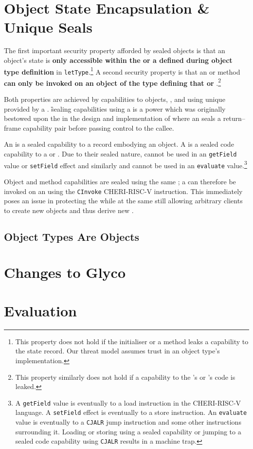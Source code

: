 \documentclass[main.tex]{subfiles}
\begin{document}
\section{Object State Encapsulation \& Unique Seals} \label{sct:obj-sec}
The first important security property afforded by sealed objects is that an object's state is \textbf{only accessible within the  or a  defined during object type definition} in \texttt{letType}.\footnote{This property does not hold if the initialiser or a method leaks a capability to the state record. Our threat model assumes trust in an object type's implementation.} A second security property is that an  or method \textbf{can only be invoked on an object of the type defining that  or }.\footnote{This property similarly does not hold if a capability to the 's or 's code is leaked.}

Both properties are achieved by  capabilities to objects, , and  using unique  provided by a . \G{sealing} capabilities using a  is a power which was originally bestowed upon the  in the design and implementation of  where an  seals a return–frame capability pair before passing control to the callee.

An \textbf{} is a sealed capability to a record embodying an object. A \textbf{} is a sealed code capability to a  or . Due to their sealed nature,  cannot be used in an \texttt{getField} value or \texttt{setField} effect and similarly  and  cannot be used in an \texttt{evaluate} value.\footnote{A \texttt{getField} value is eventually \lowered{} to a load instruction in the CHERI-RISC-V language. A \texttt{setField} effect is eventually \lowered{} to a store instruction. An \texttt{evaluate} value is eventually \lowered{} to a \texttt{CJALR} jump instruction and some other instructions surrounding it. Loading or storing using a sealed capability or jumping to a sealed code capability using \texttt{CJALR} results in a machine trap.}

Object and method capabilities are sealed using the same ; a  can therefore be invoked on an  using the \texttt{CInvoke} CHERI-RISC-V instruction. This immediately poses an issue in protecting the  while at the same still allowing arbitrary clients to create new objects and thus derive new .

\subsection{Object Types Are Objects}

\section{Changes to Glyco} \label{sct:obj-changes}

\section{Evaluation} \label{sct:obj-eval}

\onlyinsubfile{\glsaddall\printglossaries}
\end{document}
